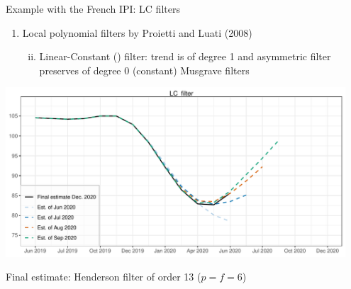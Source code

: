 \documentclass[10pt,xcolor=table,color={dvipsnames,usenames},ignorenonframetext,usepdftitle=false,english]{beamer}
\providecommand{\tightlist}{%
  \setlength{\parskip}{0pt}
  }
\newcommand\1{\mathds{1}}
\begin{document}
\begin{frame}{Example with the French IPI: LC filters}
\protect\hypertarget{example-with-the-french-ipi-lc-filters}{}
\footnotesize

\begin{enumerate}
\item
  Local polynomial filters by Proietti and Luati (2008)

  \begin{enumerate}
  [i.]
  \setcounter{enumii}{1}
  \tightlist
  \item
    Linear-Constant () filter: trend is of degree 1 and
    asymmetric filter preserves of degree 0 (constant)
    \faArrowCircleRight{} Musgrave filters
  \end{enumerate}
\end{enumerate}

\includegraphics[width=0.95\textwidth,height=\textheight]{img/illustration_slides_2.pdf}

Final estimate: Henderson filter of order 13 (\(p=f=6\))
\end{frame}
\end{document}
